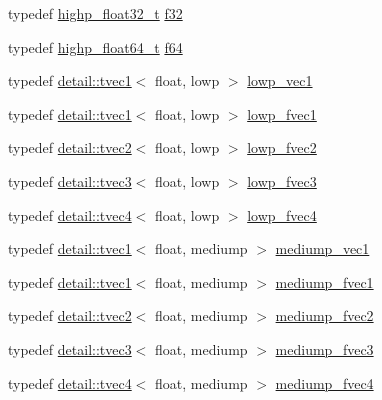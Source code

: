 \begin{DoxyCompactItemize}
\item 
typedef \hyperlink{group__gtc__type__precision_ga4e16a7818d09e2da3b81765999f23928}{highp\+\_\+float32\+\_\+t} \hyperlink{group__gtc__type__precision_ga0ec999b57f5330d9021256e96038df04}{f32}
\item 
typedef \hyperlink{group__gtc__type__precision_gae8b3b2ace5be2a61c6bf63f12643fa15}{highp\+\_\+float64\+\_\+t} \hyperlink{group__gtc__type__precision_ga2bba392e555124b36cde6abba349bab3}{f64}
\item 
typedef \hyperlink{structglm_1_1detail_1_1tvec1}{detail\+::tvec1}$<$ float, lowp $>$ \hyperlink{group__gtc__type__precision_gae48c64f920be353ece773ff367f0161c}{lowp\+\_\+vec1}
\item 
typedef \hyperlink{structglm_1_1detail_1_1tvec1}{detail\+::tvec1}$<$ float, lowp $>$ \hyperlink{group__gtc__type__precision_gad5266f0507395cf8cdfe84b9cf5496e4}{lowp\+\_\+fvec1}
\item 
typedef \hyperlink{structglm_1_1detail_1_1tvec2}{detail\+::tvec2}$<$ float, lowp $>$ \hyperlink{group__gtc__type__precision_gaf365442c52322b810bc0ed943e539229}{lowp\+\_\+fvec2}
\item 
typedef \hyperlink{structglm_1_1detail_1_1tvec3}{detail\+::tvec3}$<$ float, lowp $>$ \hyperlink{group__gtc__type__precision_ga83d77dfe136d4add9e214cd205320c12}{lowp\+\_\+fvec3}
\item 
typedef \hyperlink{structglm_1_1detail_1_1tvec4}{detail\+::tvec4}$<$ float, lowp $>$ \hyperlink{group__gtc__type__precision_ga0d016cdbff067c450122115d0620bf85}{lowp\+\_\+fvec4}
\item 
typedef \hyperlink{structglm_1_1detail_1_1tvec1}{detail\+::tvec1}$<$ float, mediump $>$ \hyperlink{group__gtc__type__precision_ga1b734d715033ab3026b2fb27e1fb7d3e}{mediump\+\_\+vec1}
\item 
typedef \hyperlink{structglm_1_1detail_1_1tvec1}{detail\+::tvec1}$<$ float, mediump $>$ \hyperlink{group__gtc__type__precision_ga4534af301d5260974cee29f76842d579}{mediump\+\_\+fvec1}
\item 
typedef \hyperlink{structglm_1_1detail_1_1tvec2}{detail\+::tvec2}$<$ float, mediump $>$ \hyperlink{group__gtc__type__precision_ga5c2686caa6838515f6727eea1b64aa05}{mediump\+\_\+fvec2}
\item 
typedef \hyperlink{structglm_1_1detail_1_1tvec3}{detail\+::tvec3}$<$ float, mediump $>$ \hyperlink{group__gtc__type__precision_ga710c3af5ebb05e5e863cff78affd25a6}{mediump\+\_\+fvec3}
\item 
typedef \hyperlink{structglm_1_1detail_1_1tvec4}{detail\+::tvec4}$<$ float, mediump $>$ \hyperlink{group__gtc__type__precision_gaba16de142de00531a1598d83716c6939}{mediump\+\_\+fvec4}

\end{DoxyCompactItemize}
